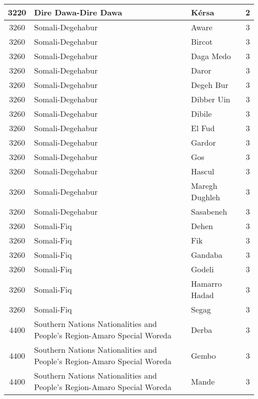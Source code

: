 \documentclass[12pt,a4paper]{report}
\begin{document}
\begin{tabular}{|c|l|l|c|}
\rule[-1ex]{0pt}{2.5ex} 3220 & Dire Dawa-Dire Dawa & K\'ersa & 2 \\ 
\hline 
\rule[-1ex]{0pt}{2.5ex} 3260 & Somali-Degehabur & Aware & 3 \\
\hline 
\rule[-1ex]{0pt}{2.5ex} 3260 & Somali-Degehabur & Bircot & 3 \\
\hline 
\rule[-1ex]{0pt}{2.5ex} 3260 & Somali-Degehabur & Daga Medo & 3 \\ 
\hline 
\rule[-1ex]{0pt}{2.5ex} 3260 & Somali-Degehabur & Daror & 3 \\
\hline 
\rule[-1ex]{0pt}{2.5ex} 3260 & Somali-Degehabur & Degeh Bur & 3 \\
\hline 
\rule[-1ex]{0pt}{2.5ex} 3260 & Somali-Degehabur & Dibber Uin & 3 \\ 
\hline 
\rule[-1ex]{0pt}{2.5ex} 3260 & Somali-Degehabur & Dibile & 3 \\ 
\hline 
\rule[-1ex]{0pt}{2.5ex} 3260 & Somali-Degehabur & El Fud & 3 \\ 
\hline 
\rule[-1ex]{0pt}{2.5ex} 3260 & Somali-Degehabur & Gardor & 3 \\ 
\hline 
\rule[-1ex]{0pt}{2.5ex} 3260 & Somali-Degehabur & Gos & 3 \\ 
\hline 
\rule[-1ex]{0pt}{2.5ex} 3260 & Somali-Degehabur & Hascul & 3 \\ 
\hline 
\rule[-1ex]{0pt}{2.5ex} 3260 & Somali-Degehabur & Maregh Dughleh & 3 \\ 
\hline 
\rule[-1ex]{0pt}{2.5ex} 3260 & Somali-Degehabur & Sasabeneh & 3 \\ 
\hline 
\rule[-1ex]{0pt}{2.5ex} 3260 & Somali-Fiq & Dehen & 3 \\ 
\hline 
\rule[-1ex]{0pt}{2.5ex} 3260 & Somali-Fiq & Fik & 3 \\ 
\hline 
\rule[-1ex]{0pt}{2.5ex} 3260 & Somali-Fiq & Gandaba & 3 \\  
\hline 
\rule[-1ex]{0pt}{2.5ex} 3260 & Somali-Fiq & Godeli & 3 \\ 
\hline 
\rule[-1ex]{0pt}{2.5ex} 3260 & Somali-Fiq & Hamarro Hadad & 3 \\ 
\hline 
\rule[-1ex]{0pt}{2.5ex} 3260 & Somali-Fiq & Segag & 3 \\ 
\hline 
\rule[-1ex]{0pt}{2.5ex} 4400 & Southern Nations Nationalities and People's Region-Amaro Special Woreda & Derba & 3 \\ 
\hline 
\rule[-1ex]{0pt}{2.5ex} 4400 & Southern Nations Nationalities and People's Region-Amaro Special Woreda & Gembo & 3 \\ 
\hline 
\rule[-1ex]{0pt}{2.5ex} 4400 & Southern Nations Nationalities and People's Region-Amaro Special Woreda & Mande & 3 \\ 

\end{tabular}
\end{document}
